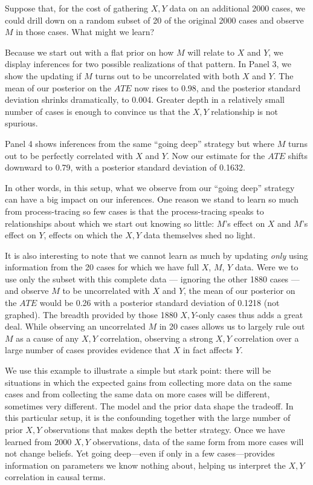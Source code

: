 \documentclass[
  12pt,
]{book}
\begin{document}
Suppose that, for the cost of gathering \(X,Y\) data on an additional 2000 cases, we could drill down on a random subset of 20 of the original 2000 cases and observe \(M\) in those cases. What might we learn?

Because we start out with a flat prior on how \(M\) will relate to \(X\) and \(Y\), we display inferences for two possible realizations of that pattern. In Panel 3, we show the updating if \(M\) turns out to be uncorrelated with both \(X\) and \(Y\). The mean of our posterior on the \(ATE\) now rises to 0.98, and the posterior standard deviation shrinks dramatically, to 0.004. Greater depth in a relatively small number of cases is enough to convince us that the \(X,Y\) relationship is not spurious.

Panel 4 shows inferences from the same ``going deep'' strategy but where \(M\) turns out to be perfectly correlated with \(X\) and \(Y\). Now our estimate for the \(ATE\) shifts downward to 0.79, with a posterior standard deviation of 0.1632.

In other words, in this setup, what we observe from our ``going deep'' strategy can have a big impact on our inferences. One reason we stand to learn so much from process-tracing so few cases is that the process-tracing speaks to relationships about which we start out knowing so little: \(M\)'s effect on \(X\) and \(M\)'s effect on \(Y\), effects on which the \(X,Y\) data themselves shed no light.

It is also interesting to note that we cannot learn as much by updating \emph{only} using information from the 20 cases for which we have full \(X\), \(M\), \(Y\) data. Were we to use only the subset with this complete data --- ignoring the other 1880 cases --- and observe \(M\) to be uncorrelated with \(X\) and \(Y\), the mean of our posterior on the \(ATE\) would be 0.26 with a posterior standard deviation of 0.1218 (not graphed). The breadth provided by those 1880 \(X,Y\)-only cases thus adds a great deal. While observing an uncorrelated \(M\) in 20 cases allows us to largely rule out \(M\) as a cause of any \(X,Y\) correlation, observing a strong \(X,Y\) correlation over a large number of cases provides evidence that \(X\) in fact affects \(Y\).

We use this example to illustrate a simple but stark point: there will be situations in which the expected gains from collecting more data on the same cases and from collecting the same data on more cases will be different, sometimes very different. The model and the prior data shape the tradeoff. In this particular setup, it is the confounding together with the large number of prior \(X,Y\) observations that makes depth the better strategy. Once we have learned from 2000 \(X,Y\) observations, data of the same form from more cases will not change beliefs. Yet going deep---even if only in a few cases---provides information on parameters we know nothing about, helping us interpret the \(X,Y\) correlation in causal terms.
\end{document}
